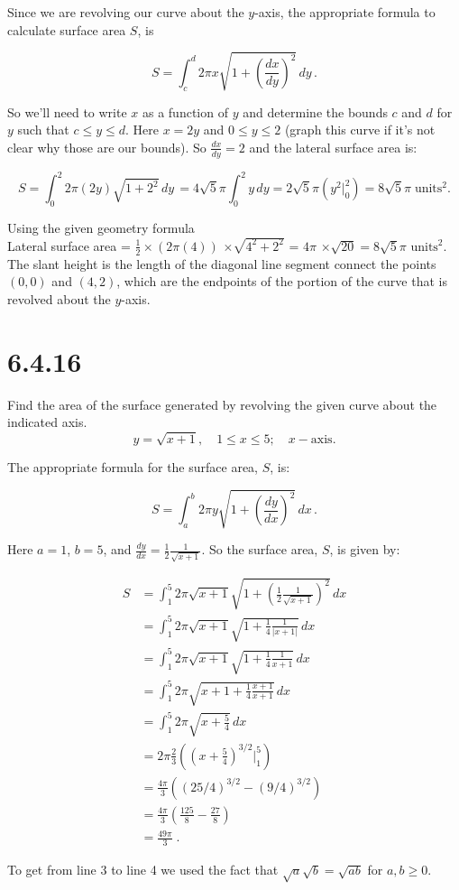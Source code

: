 \documentclass[11pt]{article}
\begin{document}
Since we are revolving our curve about the $y$-axis, the appropriate formula to calculate surface area $S$, is

$$S = \int_{c}^{d} 2\pi x \sqrt{1 + \left(\frac{dx}{dy}\right)^2} \, dy \,.$$ 

So we'll need to write $x$ as a function of $y$ and determine the bounds $c$ and $d$ for $y$ such that $c\leq y \leq d$. Here $x = 2y$ and $0 \leq y \leq 2$ (graph this curve if it's not clear why those are our bounds). So $\frac{dx}{dy} = 2$ and the lateral surface area is:

$$S = \int_{0}^{2} 2\pi (2y) \sqrt{1 + 2^2} \, dy \, = 4\sqrt{5}\pi \int_{0}^{2} y \, dy = 2\sqrt{5}\pi \left(y^2 \big\rvert_{0}^{2}\right) = 8\sqrt{5}\pi \; \text{units}^2. $$

Using the given geometry formula\\

Lateral surface area = $\frac{1}{2} \times (2\pi(4))$ $\times \sqrt{4^2 + 2^2}$ = $ 4\pi$ $\times \sqrt{20} = 8\sqrt{5}\pi \text{ units}^2.$\\

The slant height is the length of the diagonal line segment connect the points $(0,0)$ and $(4,2)$, which are the endpoints of the portion of the curve that is revolved about the $y$-axis.

\section*{6.4.16}

Find the area of the surface generated by revolving the given curve about the indicated axis. \\

$$y = \sqrt{x+1}, \quad 1\leq x \leq 5; \quad x-\text{axis}.$$

The appropriate formula for the surface area, $S$, is:

$$S = \int_{a}^{b} 2\pi y \sqrt{1 + \left(\frac{dy}{dx}\right)^2} \, dx \,.$$

Here $a= 1$, $b = 5$, and $\frac{dy}{dx} = \frac{1}{2}\frac{1}{\sqrt{x+1}}$. So the surface area, $S$, is given by:

\begin{align}
S &= \int_{1}^{5} 2\pi \sqrt{x+1} \sqrt{1 + \left(\frac{1}{2}\frac{1}{\sqrt{x+1}}\right)^2} \, dx \\
&= \int_{1}^{5} 2\pi \sqrt{x+1} \sqrt{1 + \frac{1}{4}\frac{1}{|x+1|}} \, dx\\
&= \int_{1}^{5} 2\pi \sqrt{x+1} \sqrt{1 + \frac{1}{4}\frac{1}{x+1}} \, dx\\
&= \int_{1}^{5} 2\pi \sqrt{x+1 + \frac{1}{4}\frac{x+1}{x+1}} \, dx\\
&= \int_{1}^{5} 2\pi \sqrt{x+\frac{5}{4}} \, dx\\
&=2\pi \frac{2}{3}\left((x+\frac{5}{4})^{3/2}\big\rvert_{1}^{5}\right)\\
&=\frac{4\pi}{3}\left((25/4)^{3/2} - (9/4)^{3/2}\right)\\
&=\frac{4\pi}{3}\left(\frac{125}{8} - \frac{27}{8}\right)\\
&=\frac{49\pi}{3} \;.
\end{align}

To get from line 3 to line 4 we used the fact that $\sqrt{a}\sqrt{b} = \sqrt{ab}$ for $a,b\geq 0$. 
\end{document}
